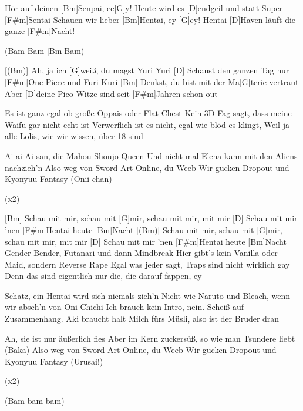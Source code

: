 

\begin{guitar}
	Hör auf deinen [Bm]Senpai, ee[G]y!
	Heute wird es [D]endgeil und statt Super [F#m]Sentai
	Schauen wir lieber [Bm]Hentai, ey [G]ey!
	Hentai [D]Haven läuft die ganze [F#m]Nacht!
	
	(Bam Bam [Bm]Bam)
	
	[(Bm)] Ah, ja ich [G]weiß, du magst Yuri Yuri
	[D] Schaust den ganzen Tag nur [F#m]One Piece und Furi Kuri
	[Bm] Denkst, du bist mit der Ma[G]terie vertraut
	Aber [D]deine Pico-Witze sind seit [F#m]Jahren schon out
	
	Es ist ganz egal ob große Oppais oder Flat Chest
	Kein 3D Fag sagt, dass meine Waifu gar nicht echt ist
	Verwerflich ist es nicht, egal wie blöd es klingt,
	Weil ja alle Lolis, wie wir wissen, über 18 sind
	
	Ai ai Ai-san, die Mahou Shoujo Queen
	Und nicht mal Elena kann mit den Aliens nachzieh'n
	Also weg von Sword Art Online, du Weeb
	Wir gucken Dropout und Kyonyuu Fantasy (Onii-chan)
	
	  (x2)
	
	[Bm] Schau mit mir, schau mit [G]mir, schau mit mir, mit mir
	[D] Schau mit mir 'nen [F#m]Hentai heute [Bm]Nacht
	[(Bm)] Schau mit mir, schau mit [G]mir, schau mit mir, mit mir
	[D] Schau mit mir 'nen [F#m]Hentai heute [Bm]Nacht
	\pagebreak
	Gender Bender, Futanari und dann Mindbreak
	Hier gibt's kein Vanilla oder Maid, sondern Reverse Rape
	Egal was jeder sagt, Traps sind nicht wirklich gay
	Denn das sind eigentlich nur die, die darauf fappen, ey
	
	Schatz, ein Hentai wird sich niemals zieh'n
	Nicht wie Naruto und Bleach, wenn wir abseh'n von Oni Chichi
	Ich brauch kein Intro, nein. Scheiß auf Zusammenhang.
	Aki braucht halt Milch fürs Müsli, also ist der Bruder dran
	
	Ah, sie ist nur äußerlich fies
	Aber im Kern zuckersüß, so wie man Tsundere liebt (Baka)
	Also weg von Sword Art Online, du Weeb
	Wir gucken Dropout und Kyonyuu Fantasy (Urusai!)
	
	  (x2)
	
	(Bam bam bam)
	
	 
	
\end{guitar}
